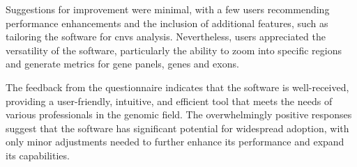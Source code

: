 Suggestions for improvement were minimal, with a few users recommending performance enhancements and the inclusion of additional features, such as tailoring the software for \ac{cnvs} analysis. Nevertheless, users appreciated the versatility of the software, particularly the ability to zoom into specific regions and generate metrics for gene panels, genes and exons.

The feedback from the questionnaire indicates that the software is well-received, providing a user-friendly, intuitive, and efficient tool that meets the needs of various professionals in the genomic field. The overwhelmingly positive responses suggest that the software has significant potential for widespread adoption, with only minor adjustments needed to further enhance its performance and expand its capabilities.




